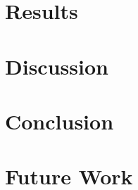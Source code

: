 \documentclass[12pt,a4paper]{article}
\begin{document}
\clearpage
\section{Results}\label{sec:results}


\section{Discussion}\label{sec:discussion}


\clearpage
\section{Conclusion}\label{sec:conclusion}


\section{Future Work}\label{sec:future}


\clearpage
{}

\end{document}
